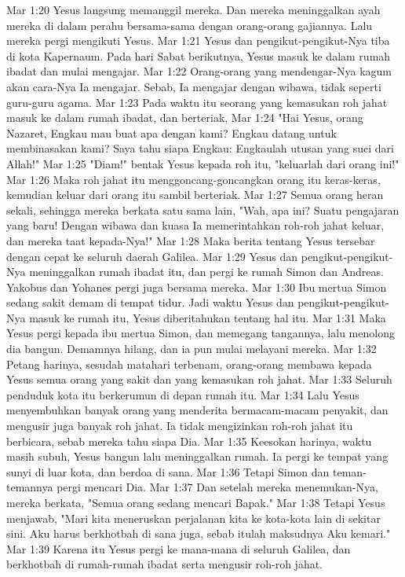 Mar 1:20  Yesus langsung memanggil mereka. Dan mereka meninggalkan ayah mereka di dalam perahu bersama-sama dengan orang-orang gajiannya. Lalu mereka pergi mengikuti Yesus.
Mar 1:21  Yesus dan pengikut-pengikut-Nya tiba di kota Kapernaum. Pada hari Sabat berikutnya, Yesus masuk ke dalam rumah ibadat dan mulai mengajar.
Mar 1:22  Orang-orang yang mendengar-Nya kagum akan cara-Nya Ia mengajar. Sebab, Ia mengajar dengan wibawa, tidak seperti guru-guru agama.
Mar 1:23  Pada waktu itu seorang yang kemasukan roh jahat masuk ke dalam rumah ibadat, dan berteriak,
Mar 1:24  "Hai Yesus, orang Nazaret, Engkau mau buat apa dengan kami? Engkau datang untuk membinasakan kami? Saya tahu siapa Engkau: Engkaulah utusan yang suci dari Allah!"
Mar 1:25  "Diam!" bentak Yesus kepada roh itu, "keluarlah dari orang ini!"
Mar 1:26  Maka roh jahat itu menggoncang-goncangkan orang itu keras-keras, kemudian keluar dari orang itu sambil berteriak.
Mar 1:27  Semua orang heran sekali, sehingga mereka berkata satu sama lain, "Wah, apa ini? Suatu pengajaran yang baru! Dengan wibawa dan kuasa Ia memerintahkan roh-roh jahat keluar, dan mereka taat kepada-Nya!"
Mar 1:28  Maka berita tentang Yesus tersebar dengan cepat ke seluruh daerah Galilea.
Mar 1:29  Yesus dan pengikut-pengikut-Nya meninggalkan rumah ibadat itu, dan pergi ke rumah Simon dan Andreas. Yakobus dan Yohanes pergi juga bersama mereka.
Mar 1:30  Ibu mertua Simon sedang sakit demam di tempat tidur. Jadi waktu Yesus dan pengikut-pengikut-Nya masuk ke rumah itu, Yesus diberitahukan tentang hal itu.
Mar 1:31  Maka Yesus pergi kepada ibu mertua Simon, dan memegang tangannya, lalu menolong dia bangun. Demamnya hilang, dan ia pun mulai melayani mereka.
Mar 1:32  Petang harinya, sesudah matahari terbenam, orang-orang membawa kepada Yesus semua orang yang sakit dan yang kemasukan roh jahat.
Mar 1:33  Seluruh penduduk kota itu berkerumun di depan rumah itu.
Mar 1:34  Lalu Yesus menyembuhkan banyak orang yang menderita bermacam-macam penyakit, dan mengusir juga banyak roh jahat. Ia tidak mengizinkan roh-roh jahat itu berbicara, sebab mereka tahu siapa Dia.
Mar 1:35  Keesokan harinya, waktu masih subuh, Yesus bangun lalu meninggalkan rumah. Ia pergi ke tempat yang sunyi di luar kota, dan berdoa di sana.
Mar 1:36  Tetapi Simon dan teman-temannya pergi mencari Dia.
Mar 1:37  Dan setelah mereka menemukan-Nya, mereka berkata, "Semua orang sedang mencari Bapak."
Mar 1:38  Tetapi Yesus menjawab, "Mari kita meneruskan perjalanan kita ke kota-kota lain di sekitar sini. Aku harus berkhotbah di sana juga, sebab itulah maksudnya Aku kemari."
Mar 1:39  Karena itu Yesus pergi ke mana-mana di seluruh Galilea, dan berkhotbah di rumah-rumah ibadat serta mengusir roh-roh jahat.
